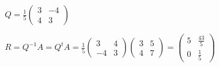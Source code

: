 		  	$Q = \frac{1}{5} \begin{pmatrix} 3 & -4 \\ 4 & 3 \end{pmatrix} 	 $ \\
		  	
		  	\vspace{0.2cm}
		  	
		  	$R = Q^{-1} A = Q^t A = \frac{1}{5}\begin{pmatrix} 3 & 4 \\ -4 & 3 \end{pmatrix}  \begin{pmatrix} 3 & 5 \\ 4 & 7 \end{pmatrix} =  \begin{pmatrix} 5 & \frac{43}{5} \\ 0 & \frac{1}{5}  \end{pmatrix} $
		  	
		    
		    
		    \vfill\null
		    \columnbreak